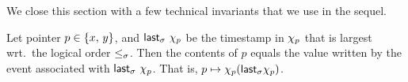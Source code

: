 
  





We close this section with a few technical invariants that we use in
the sequel.


\begin{invariant}\label{inv:last-key}%
Let pointer $p \in \{x,\, y\}$, and $\mathsf{last}_\sigma\ \chi_p$
be the timestamp in $\chi_p$ that is largest wrt.~the logical order
$\mathrel{\leq_\sigma}$. Then the contents of $p$ equals the value written by the
event associated with $\mathsf{last}_\sigma\ \chi_p$. That is, $p
\mapsto \chi_p (\mathsf{last}_\sigma \chi_p)$.
\end{invariant}


